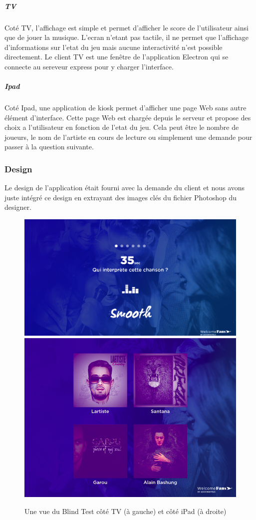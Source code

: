 \subparagraph{TV} Coté TV, l'affichage est simple et permet d'afficher le score de l'utilisateur ainsi que de jouer la musique.
L'ecran n'etant pas tactile, il ne permet que l'affichage d'informations sur l'etat du jeu mais aucune interactivité n'est possible directement.
Le client TV est une fenêtre de l'application Electron qui se connecte au sereveur express pour y charger l'interface.

\subparagraph{Ipad} Coté Ipad, une application de kiosk permet d'afficher une page Web sans autre élément d'interface.
Cette page Web est chargée depuis le serveur et propose des choix a l'utilisateur en fonction de l'etat du jeu.
Cela peut être le nombre de joueurs, le nom de l'artiste en cours de lecture ou simplement une demande pour passer à la question suivante.

\subsubsection{Design}

Le design de l'application était fourni avec la demande du client et nous avons juste intégré ce design en extrayant des images clés du fichier Photoshop du designer.

\begin{figure}[h]
    \centering
    \includegraphics[scale=0.23]{img/blind-test-tv.png}
    \includegraphics[scale=0.22]{img/blind-test-ipad.png}
    \caption{Une vue du Blind Test côté TV (à gauche) et côté iPad (à droite)}
\end{figure}

